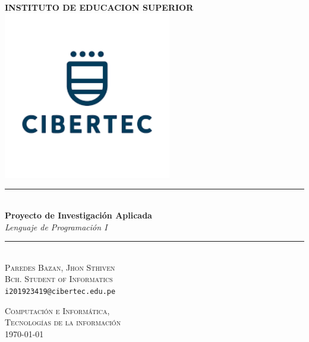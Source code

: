 \documentclass[12pt,a4paper]{article}
\newcommand{\HRule}{\rule{\linewidth}{0.5mm}}
\begin{document}
\begin{titlepage}
\begin{center}

{\Large
 \textbf{INSTITUTO DE EDUCACION SUPERIOR}
 }
\includegraphics[width=0.55\textwidth]{logo-cibertec.png}~\\[1cm]


\HRule \\[0.4cm]
{ \LARGE 
  \textbf{Proyecto de Investigaci\'on Aplicada}\\[0.4cm]
  \emph{Lenguaje de Programaci\'on I}\\[0.4cm]
}
\HRule \\[1.5cm]



\textsc{ \large
  Paredes Bazan, Jhon Sthiven \\[0.1cm]
  Bch. Student of Informatics\\[0.1cm]}
  \texttt{i201923419@cibertec.edu.pe}

\vfill

\textsc{\large Computaci\'on e Inform\'atica,\\Tecnolog\'ias de la informaci\'on}\\[0.4cm]


{\large \today}
 
\end{center}
\end{titlepage}
\end{document}
